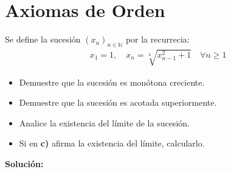 \documentclass[12pt]{book}
\begin{document}
\chapter{Axiomas de Orden}

\begin{prob}{}{}
    Se define la sucesión $(x_n)_{n \in \mathbb{N}}$ por la recurrecia:
    \begin{align*}
        x_1=1, \quad x_n = \sqrt[4]{x_{n-1}^2+1} \quad \forall n \geq 1
    \end{align*}
    \begin{itemize}
        \item[\textbf{a)}] Demuestre que la sucesión es monótona creciente.
        \item[\textbf{b)}] Demuestre que la sucesión es acotada superiormente.
        \item[\textbf{c)}] Analice la existencia del límite de la sucesión.
        \item[\textbf{d)}] Si en \textbf{c)} afirma la existencia del límite, calcularlo.
    \end{itemize}
\end{prob}
\textbf{Solución:}
\end{document}
